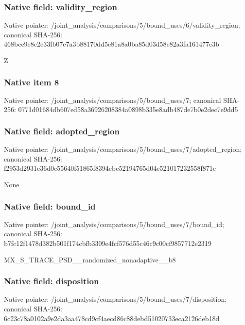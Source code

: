 \documentclass[10pt,a4paper]{article}
\begin{document}
\subsubsection{Native field: validity\_\allowbreak{}region}
Native pointer: /joint\_\allowbreak{}analysis/comparisons/5/bound\_\allowbreak{}uses/6/validity\_\allowbreak{}region; canonical SHA-256: 468bcc9e8c2c33fb07e7a3b88170dd5e81a8a0ba85d03d58c82a3fa161477c3b

\begingroup\raggedright\sloppy Z\par\endgroup

\subsubsection{Native item 8}
Native pointer: /joint\_\allowbreak{}analysis/comparisons/5/bound\_\allowbreak{}uses/7; canonical SHA-256: 0771d01684db607ed58a36926208384a0898b335e8adb487de7b0e2dec7e9dd5

\subsubsection{Native field: adopted\_\allowbreak{}region}
Native pointer: /joint\_\allowbreak{}analysis/comparisons/5/bound\_\allowbreak{}uses/7/adopted\_\allowbreak{}region; canonical SHA-256: f2953d2931e36d0c55640f51865f8394ebe52194765d04e521017232558f871c

\begingroup\raggedright\sloppy None\par\endgroup

\subsubsection{Native field: bound\_\allowbreak{}id}
Native pointer: /joint\_\allowbreak{}analysis/comparisons/5/bound\_\allowbreak{}uses/7/bound\_\allowbreak{}id; canonical SHA-256: b7fc12f1478d382b501f174cbfb3309e4fcf576d55c46c9c00cf9857712e2319

\begingroup\raggedright\sloppy MX\_\allowbreak{}S\_\allowbreak{}TRACE\_\allowbreak{}PSD\_\allowbreak{}\_\allowbreak{}randomized\_\allowbreak{}nonadaptive\_\allowbreak{}\_\allowbreak{}b8\par\endgroup

\subsubsection{Native field: disposition}
Native pointer: /joint\_\allowbreak{}analysis/comparisons/5/bound\_\allowbreak{}uses/7/disposition; canonical SHA-256: 6c23c78a0102a9e2da3aa478cd9cf4aecd86c88debd51020733eca2126deb18d
\end{document}
